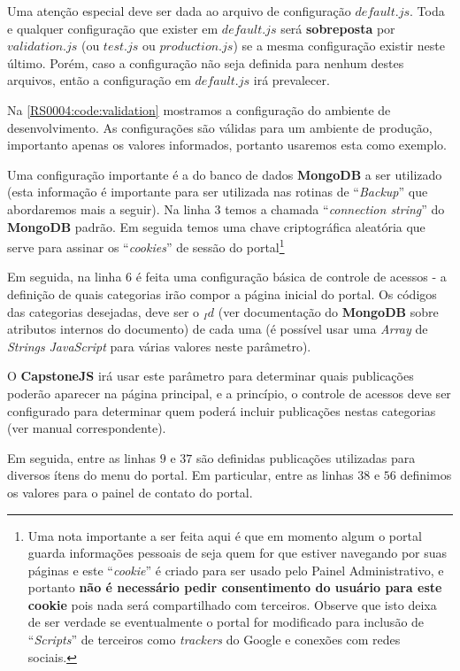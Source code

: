 \begin{displayquote}
    Uma atenção especial deve ser dada ao arquivo de configuração $default.js$. Toda e qualquer configuração que exister em $default.js$ será \textbf{sobreposta} por $validation.js$ (ou $test.js$ ou $production.js$) se a mesma configuração existir neste último. Porém, caso a configuração não seja definida para nenhum destes arquivos, então a configuração em $default.js$ irá prevalecer.
\end{displayquote}

Na \cref{RS0004:code:validation} mostramos a configuração do ambiente de desenvolvimento. As configurações são válidas para um ambiente de produção, importanto apenas os valores informados, portanto usaremos esta como exemplo.

Uma configuração importante é a do banco de dados \textbf{MongoDB} a ser utilizado (esta informação é importante para ser utilizada nas rotinas de ``\textit{Backup}'' que abordaremos mais a seguir). Na linha $3$ temos a chamada ``\textit{connection string}'' do \textbf{MongoDB} padrão. Em seguida temos uma chave criptográfica aleatória que serve para assinar os ``\textit{cookies}'' de sessão do portal\footnote{Uma nota importante a ser feita aqui é que em momento algum o portal guarda informações pessoais de seja quem for que estiver navegando por suas páginas e este ``\textit{cookie}'' é criado para ser usado pelo Painel Administrativo, e portanto \textbf{não é necessário pedir consentimento do usuário para este cookie} pois nada será compartilhado com terceiros. Observe que isto deixa de ser verdade se eventualmente o portal for modificado para inclusão de ``\textit{Scripts}'' de terceiros como \textit{trackers} do Google e conexões com redes sociais.}

Em seguida, na linha $6$ é feita uma configuração básica de controle de acessos - a definição de quais categorias irão compor a página inicial do portal. Os códigos das categorias desejadas, deve ser o $_Id$ (ver documentação do \textbf{MongoDB} sobre atributos internos do documento) de cada uma (é possível usar uma \textit{Array} de \textit{Strings} \textit{JavaScript} para várias valores neste parâmetro).

O \textbf{CapstoneJS} irá usar este parâmetro para determinar quais publicações poderão aparecer na página principal, e a princípio, o controle de acessos deve ser configurado para determinar quem poderá incluir publicações nestas categorias (ver manual correspondente).

Em seguida, entre as linhas $9$ e $37$ são definidas publicações utilizadas para diversos ítens do menu do portal. Em particular, entre as linhas $38$ e $56$ definimos os valores para o painel de contato do portal.

